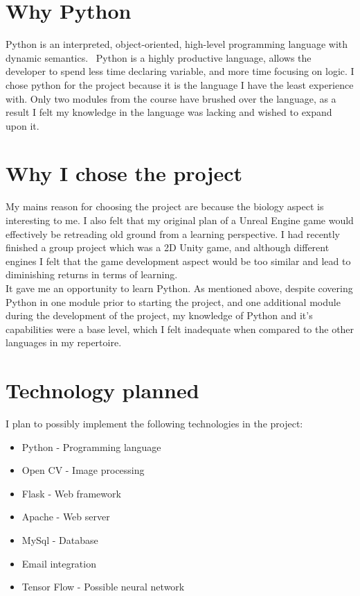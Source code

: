 \section {Why Python}
Python is an interpreted, object-oriented, high-level programming language with dynamic semantics.~\cite{python} Python is a highly productive language, allows the developer to spend less time declaring variable, and more time focusing on logic. I chose python for the project because it is the language I have the least experience with. Only two modules from the course have brushed over the language, as a result I felt my knowledge in the language was lacking and wished to expand upon it.
\section {Why I chose the project}
My mains reason for choosing the project are because the biology aspect is interesting to me. I also felt that my original plan of a Unreal Engine game would effectively be retreading old ground from a learning perspective. I had recently finished a group project which was a 2D Unity game, and although different engines I felt that the game development aspect would be too similar and lead to diminishing returns in terms of learning. \\ It gave me an opportunity to learn Python. As mentioned above, despite covering Python in one module prior to starting the project, and one additional module during the development of the project, my knowledge of Python and it's capabilities were a base level, which I felt inadequate when compared to the other languages in my repertoire.
\section {Technology planned}
I plan to possibly implement the following technologies in the project:
\begin{itemize}
    \item Python - Programming language
    \item Open CV - Image processing
    \item Flask - Web framework
    \item Apache - Web server
    \item MySql - Database
    \item Email integration
    \item Tensor Flow - Possible neural network
\end{itemize}
